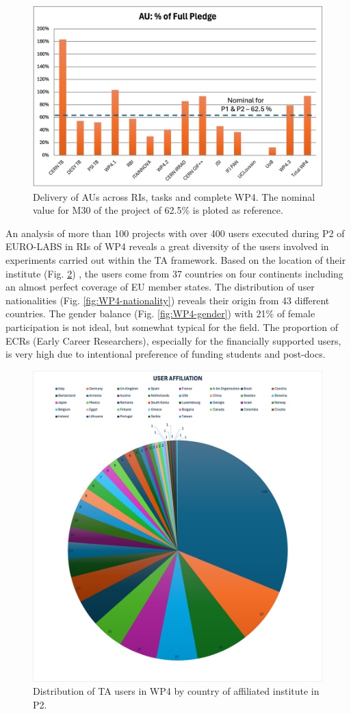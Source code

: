 \begin{figure}[!h]
    \centering
    \includegraphics[width=0.75\linewidth]{AU_P12-pledge.png}
    \caption{Delivery of AUs across RIs, tasks and complete WP4. The nominal value for M30 of the project of 62.5\% is ploted as reference.}
    \label{fig:AUs}
\end{figure}

An analysis of more than 100 projects with over 400 users executed during P2 of EURO-LABS in RIs of WP4 reveals a great diversity of the users involved in experiments carried out within the TA framework. Based on the location of their institute  (Fig. \ref{fig:WP4-affiliation}) , the users come from 37 countries on four continents including an almost perfect coverage of EU member states. The distribution of user nationalities  (Fig. \ref{fig:WP4-nationality}) reveals their origin from 43 different countries. The gender balance (Fig. \ref{fig:WP4-gender}) with 21\% of female participation is not ideal, but somewhat typical for the field. The proportion of ECRs (Early Career Researchers), especially for the financially supported users, is very high due to intentional preference of funding students and post-docs.

\begin{figure}[!h]
    \centering
    \includegraphics[width=0.75\linewidth]{P2-affiliation.png}
    \caption{Distribution of TA users in WP4 by country of affiliated institute in P2.}
    \label{fig:WP4-affiliation}
\end{figure}

